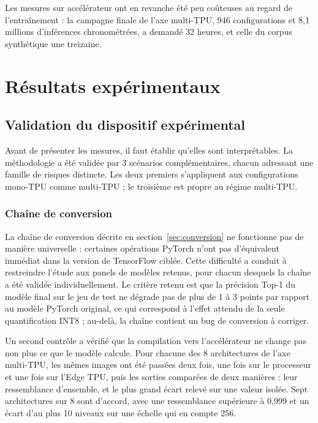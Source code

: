 \documentclass[11pt,a4paper]{report}
\begin{document}
Les mesures sur accélérateur ont en revanche été peu coûteuses au regard de l'entraînement : la campagne finale de l'axe multi-TPU, 946 configurations et 8,1 millions d'inférences chronométrées, a demandé 32 heures, et celle du corpus synthétique une treizaine.

\chapter{Résultats expérimentaux}
\label{chap:resultats}

\section{Validation du dispositif expérimental}
\label{sec:validation}

Avant de présenter les mesures, il faut établir qu'elles sont interprétables. La méthodologie a été validée par 3 scénarios complémentaires, chacun adressant une famille de risques distincte. Les deux premiers s'appliquent aux configurations mono-TPU comme multi-TPU ; le troisième est propre au régime multi-TPU.

\subsection{Chaîne de conversion}

La chaîne de conversion décrite en section~\ref{sec:conversion} ne fonctionne pas de manière universelle : certaines opérations PyTorch n'ont pas d'équivalent immédiat dans la version de TensorFlow ciblée. Cette difficulté a conduit à restreindre l'étude aux panels de modèles retenus, pour chacun desquels la chaîne a été validée individuellement. Le critère retenu est que la précision Top-1 du modèle final sur le jeu de test ne dégrade pas de plus de 1 à 3 points par rapport au modèle PyTorch original, ce qui correspond à l'effet attendu de la seule quantification INT8 ; au-delà, la chaîne contient un bug de conversion à corriger.

Un second contrôle a vérifié que la compilation vers l'accélérateur ne change pas non plus ce que le modèle calcule. Pour chacune des 8 architectures de l'axe multi-TPU, les mêmes images ont été passées deux fois, une fois sur le processeur et une fois sur l'Edge TPU, puis les sorties comparées de deux manières : leur ressemblance d'ensemble, et le plus grand écart relevé sur une valeur isolée. Sept architectures sur 8 sont d'accord, avec une ressemblance supérieure à 0,999 et un écart d'au plus 10 niveaux sur une échelle qui en compte 256.
\end{document}
